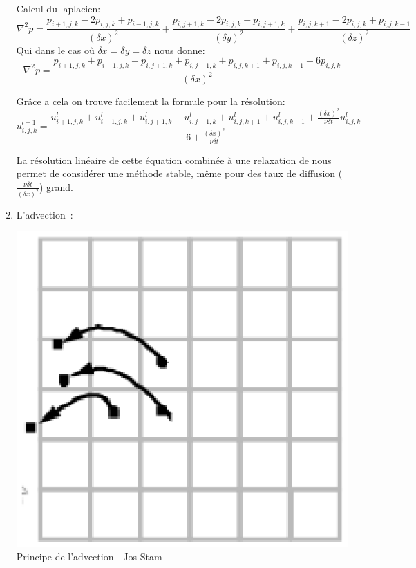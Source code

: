\documentclass[a4paper,10pt]{article}
\begin{document}
\begin{enumerate}
  Calcul du laplacien:
  \begin{equation}
    {\nabla^2}p = \frac{p_{i+1,j,k} - 2p_{i,j,k} + p_{i-1,j,k} }{({\delta x})^2} + \frac{p_{i,j+1,k} - 2p_{i,j,k} + p_{i,j+1,k}}{({\delta y})^2} + \frac{p_{i,j,k+1} - 2p_{i,j,k} + p_{i,j,k-1}}{({\delta z})^2} 
  \end{equation}
  Qui dans le cas où $\delta x = \delta y =\delta z$ nous donne:
  \begin{equation}
    {\nabla^2}p = \frac{p_{i+1,j,k} + p_{i-1,j,k} + p_{i,j+1,k} + p_{i,j-1,k} + p_{i,j,k+1} + p_{i,j,k-1} - 6p_{i,j,k} }{({\delta x})^2} 
  \end{equation}
  
  Grâce a cela on trouve facilement la formule pour la résolution:
  \begin{equation}
    u_{i,j,k}^{l+1} = \frac{u_{i+1,j,k}^{l} + 
      u_{i-1,j,k}^{l} + 
      u_{i,j+1,k}^{l} +
      u_{i,j-1,k}^{l} + 
      u_{i,j,k+1}^{l} + 
      u_{i,j,k-1}^{l} + 
      \frac{({\delta x})^2}{\nu \delta t} u_{i,j,k}^{l}}{ 6 + \frac{({\delta x})^2}{\nu \delta t}} 
  \end{equation}
  
  La résolution linéaire de cette équation combinée à une relaxation de
   nous permet de considérer une méthode stable, même pour
  des taux de diffusion ($ \frac{\nu \delta t}{({\delta x})^2}$)
  grand.\\
  
  \item{L'advection~:}\\ 
    \begin{center}
	\includegraphics[scale=0.5]{STAM2.ps}\\
	Principe de l'advection - Jos Stam
    \end{center}
  

\end{enumerate}
\end{document}

